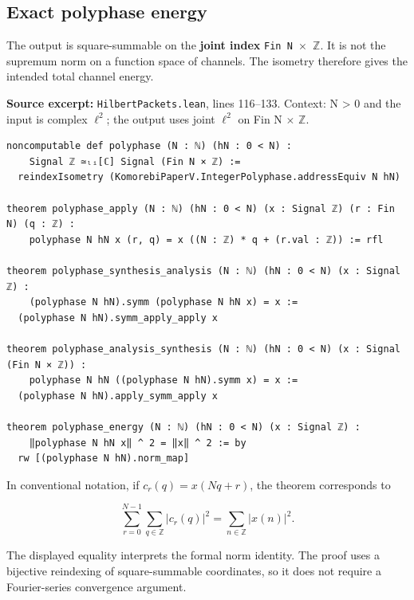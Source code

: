 \documentclass[11pt]{article}
\begin{document}
\hypertarget{exact-polyphase-energy}{%
\subsection{Exact polyphase energy}\label{exact-polyphase-energy}}

The output is square-summable on the \textbf{joint index} \texttt{Fin N \ensuremath{\times} \ensuremath{\mathbb Z}}. It is not the supremum norm on a function space of channels. The isometry therefore gives the intended total channel energy.

\textbf{Source excerpt:} \texttt{HilbertPackets.lean}, lines 116--133. Context: N \textgreater{} 0 and the input is complex $\ell^2$; the output uses joint $\ell^2$ on Fin N \ensuremath{\times} \ensuremath{\mathbb Z}.

\begin{minipage}{\linewidth}
\begin{lstlisting}
noncomputable def polyphase (N : ℕ) (hN : 0 < N) :
    Signal ℤ ≃ₗᵢ[ℂ] Signal (Fin N × ℤ) :=
  reindexIsometry (KomorebiPaperV.IntegerPolyphase.addressEquiv N hN)

theorem polyphase_apply (N : ℕ) (hN : 0 < N) (x : Signal ℤ) (r : Fin N) (q : ℤ) :
    polyphase N hN x (r, q) = x ((N : ℤ) * q + (r.val : ℤ)) := rfl

theorem polyphase_synthesis_analysis (N : ℕ) (hN : 0 < N) (x : Signal ℤ) :
    (polyphase N hN).symm (polyphase N hN x) = x :=
  (polyphase N hN).symm_apply_apply x

theorem polyphase_analysis_synthesis (N : ℕ) (hN : 0 < N) (x : Signal (Fin N × ℤ)) :
    polyphase N hN ((polyphase N hN).symm x) = x :=
  (polyphase N hN).apply_symm_apply x

theorem polyphase_energy (N : ℕ) (hN : 0 < N) (x : Signal ℤ) :
    ‖polyphase N hN x‖ ^ 2 = ‖x‖ ^ 2 := by
  rw [(polyphase N hN).norm_map]
\end{lstlisting}
\end{minipage}\par

In conventional notation, if \(c_r(q)=x(Nq+r)\), the theorem corresponds to

\[\sum_{r=0}^{N-1}\sum_{q\in\mathbb Z}|c_r(q)|^2
=\sum_{n\in\mathbb Z}|x(n)|^2.\]

The displayed equality interprets the formal norm identity. The proof uses a bijective reindexing of square-summable coordinates, so it does not require a Fourier-series convergence argument.
\end{document}
